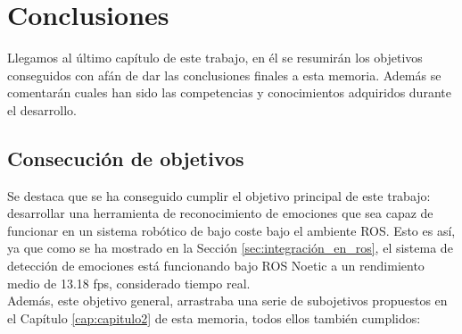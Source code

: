 \chapter{Conclusiones}
\label{cap:capitulo6}

Llegamos al último capítulo de este trabajo, en él se resumirán los objetivos conseguidos con afán de dar las conclusiones finales a esta memoria. Además se comentarán cuales han sido las competencias y conocimientos adquiridos durante el desarrollo.

\section{Consecución de objetivos}

Se destaca que se ha conseguido cumplir el objetivo principal de este trabajo: desarrollar una herramienta de reconocimiento de emociones que sea capaz de funcionar en un sistema robótico de bajo coste bajo el ambiente ROS. Esto es así, ya que como se ha mostrado en la Sección \ref{sec:integración_en_ros}, el sistema de detección de emociones está funcionando bajo ROS Noetic a un rendimiento medio de 13.18 fps, considerado tiempo real.\\

Además, este objetivo general, arrastraba una serie de subojetivos propuestos en el Capítulo \ref{cap:capitulo2} de esta memoria, todos ellos también cumplidos:

